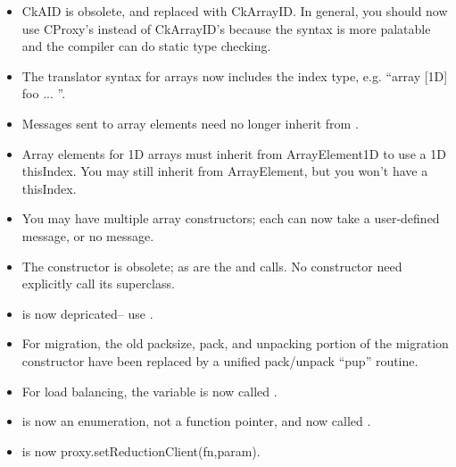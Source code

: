 \begin{itemize}

\item CkAID is obsolete, and replaced with CkArrayID.  In general,
you should now use CProxy's instead of CkArrayID's because the syntax
is more palatable and the compiler can do static type checking.

\item The translator syntax for arrays now includes the index type,
e.g. ``array [1D] foo { ... }''.

\item Messages sent to array elements need no longer inherit from 
.

\item Array elements for 1D arrays must inherit from ArrayElement1D
to use a 1D thisIndex.  You may still inherit from ArrayElement, but you
won't have a thisIndex.

\item You may have multiple array constructors; each can now take a user-defined message, or no message.  

\item The  constructor is obsolete;
as are the  and  calls. No
constructor need explicitly call its superclass.

\item {} is now depricated-- use 
.

\item For migration, the old packsize, pack, and unpacking portion of
the migration constructor have been replaced by a unified pack/unpack 
``pup'' routine.

\item For load balancing, the  variable is now called .

\item {} is now an enumeration, not a function pointer, and now called .

\item {}
is now proxy.setReductionClient(fn,param).
\end{itemize}



